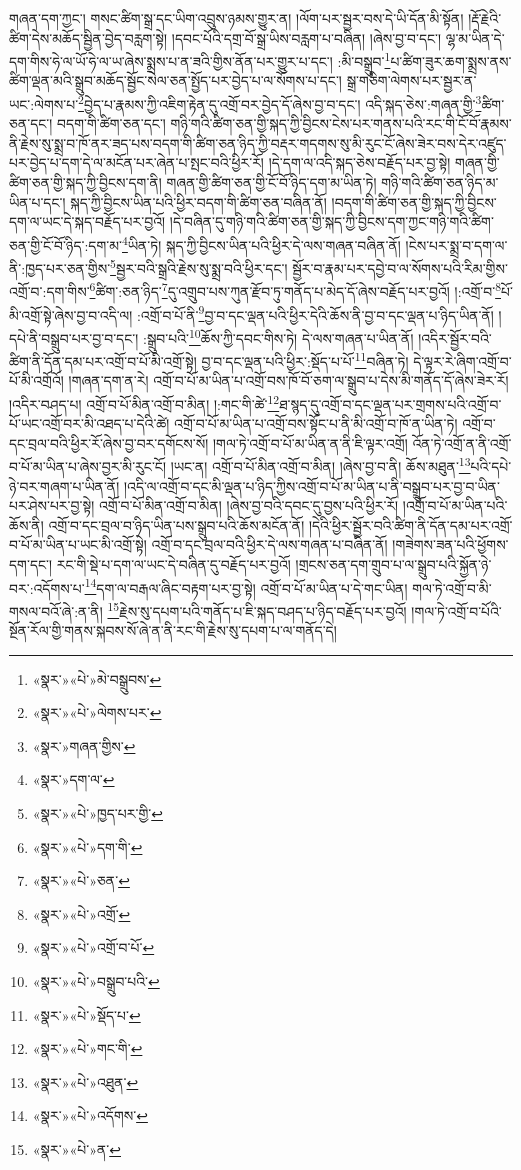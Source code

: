 གཞན་དག་ཀྱང་། གསང་ཚིག་སྒྲ་དང་ཡིག་འབྲུས་ཉམས་གྱུར་ན། །ལོག་པར་སྦྱར་བས་དེ་ཡི་དོན་མི་སྟོན། །རྡོ་རྗེའི་ཚིག་དེས་མཆོད་སྦྱིན་བྱེད་བརླག་སྟེ། །དབང་པོའི་དགྲ་བོ་སྒྲ་ཡིས་བརླག་པ་བཞིན། །ཞེས་བྱ་བ་དང་། ལྷ་མ་ཡིན་དེ་དག་གིས་ཧེ་ལ་ཡོ་ཧེ་ལ་ཡ་ཞེས་སྨྲས་པ་ན་ཟའི་གྱིས་ནོན་པར་གྱུར་པ་དང་། :མི་བསྒྲུབ་\footnote{«སྣར་»«པེ་»མེ་བསྒྲུབས་}པ་ཚིག་ཟུར་ཆག་སྨྲས་ནས་ཚིག་ལྡན་མའི་སྒྲུབ་མཆོད་སྦྱོང་སེལ་ཅན་སྤྱོད་པར་བྱེད་པ་ལ་སོགས་པ་དང་། སྒྲ་གཅིག་ལེགས་པར་སྦྱར་ན་ཡང་:ལེགས་པ་\footnote{«སྣར་»«པེ་»ལེགས་པར་}བྱེད་པ་རྣམས་ཀྱི་འཇིག་རྟེན་དུ་འགྲོ་བར་བྱེད་དོ་ཞེས་བྱ་བ་དང་། འདི་སྐད་ཅེས་:གཞན་གྱི་\footnote{«སྣར་»གཞན་གྱིས་}ཚིག་ཅན་དང་། བདག་གི་ཚིག་ཅན་དང་། གཉི་གའི་ཚིག་ཅན་གྱི་སྐད་ཀྱི་བྱིངས་ངེས་པར་གནས་པའི་རང་གི་ངོ་བོ་རྣམས་ནི་རྗེས་སུ་སྨྲ་བ་ཁོ་ནར་ཟད་པས་བདག་གི་ཚིག་ཅན་ཉིད་ཀྱི་བརྡར་གདགས་སུ་མི་རུང་ངོ་ཞེས་ཟེར་བས་དེར་འཛུད་པར་བྱེད་པ་དག་དེ་ལ་མངོན་པར་ཞེན་པ་སྤང་བའི་ཕྱིར་རོ། །དེ་དག་ལ་འདི་སྐད་ཅེས་བརྗོད་པར་བྱ་སྟེ། གཞན་གྱི་ཚིག་ཅན་གྱི་སྐད་ཀྱི་བྱིངས་དག་ནི། གཞན་གྱི་ཚིག་ཅན་གྱི་ངོ་བོ་ཉིད་དག་མ་ཡིན་ཏེ། གཉི་གའི་ཚིག་ཅན་ཉིད་མ་ཡིན་པ་དང་། སྐད་ཀྱི་བྱིངས་ཡིན་པའི་ཕྱིར་བདག་གི་ཚིག་ཅན་བཞིན་ནོ། །བདག་གི་ཚིག་ཅན་གྱི་སྐད་ཀྱི་བྱིངས་དག་ལ་ཡང་དེ་སྐད་བརྗོད་པར་བྱའོ། །དེ་བཞིན་དུ་གཉི་གའི་ཚིག་ཅན་གྱི་སྐད་ཀྱི་བྱིངས་དག་ཀྱང་གཉི་གའི་ཚིག་ཅན་གྱི་ངོ་བོ་ཉིད་:དག་མ་\footnote{«སྣར་»དག་ལ་}ཡིན་ཏེ། སྐད་ཀྱི་བྱིངས་ཡིན་པའི་ཕྱིར་དེ་ལས་གཞན་བཞིན་ནོ། །ངེས་པར་སྨྲ་བ་དག་ལ་ནི་:ཁྱད་པར་ཅན་གྱིས་\footnote{«སྣར་»«པེ་»ཁྱད་པར་གྱི་}སྦྱར་བའི་སྒྲའི་རྗེས་སུ་སྨྲ་བའི་ཕྱིར་དང་། སྦྱོར་བ་རྣམ་པར་དབྱེ་བ་ལ་སོགས་པའི་རིམ་གྱིས་འགྲོ་བ་:དག་གིས་\footnote{«སྣར་»«པེ་»དག་གི་}ཚིག་:ཅན་ཉིད་\footnote{«སྣར་»«པེ་»ཅན་}དུ་འགྲུབ་པས་ཀུན་རྫོབ་ཏུ་གནོད་པ་མེད་དོ་ཞེས་བརྗོད་པར་བྱའོ། །:འགྲོ་བ་\footnote{«སྣར་»«པེ་»འགྲོ་}པོ་མི་འགྲོ་སྟེ་ཞེས་བྱ་བ་འདི་ལ། :འགྲོ་བ་པོ་ནི་\footnote{«སྣར་»«པེ་»འགྲོ་བ་པོ་}བྱ་བ་དང་ལྡན་པའི་ཕྱིར་དེའི་ཆོས་ནི་བྱ་བ་དང་ལྡན་པ་ཉིད་ཡིན་ནོ། །དཔེ་ནི་བསྒྲུབ་པར་བྱ་བ་དང་། :སྒྲུབ་པའི་\footnote{«སྣར་»«པེ་»བསྒྲུབ་པའི་}ཆོས་ཀྱི་དབང་གིས་ཏེ། དེ་ལས་གཞན་པ་ཡིན་ནོ། །འདིར་སྦྱོར་བའི་ཚིག་ནི་དོན་དམ་པར་འགྲོ་བ་པོ་མི་འགྲོ་སྟེ། བྱ་བ་དང་ལྡན་པའི་ཕྱིར་:སྡོད་པ་པོ་\footnote{«སྣར་»«པེ་»སྡོད་པ་}བཞིན་ཏེ། དེ་ལྟར་རེ་ཞིག་འགྲོ་བ་པོ་མི་འགྲོའོ། །གཞན་དག་ན་རེ། འགྲོ་བ་པོ་མ་ཡིན་པ་འགྲོ་བས་ཁོ་བོ་ཅག་ལ་སྒྲུབ་པ་དེས་མི་གནོད་དོ་ཞེས་ཟེར་རོ། །འདིར་བཤད་པ། འགྲོ་བ་པོ་མིན་འགྲོ་བ་མིན། །:གང་གི་ཚེ་\footnote{«སྣར་»«པེ་»གང་གི་}ཐ་སྙད་དུ་འགྲོ་བ་དང་ལྡན་པར་གྲགས་པའི་འགྲོ་བ་པོ་ཡང་འགྲོ་བར་མི་འཐད་པ་དེའི་ཚེ། འགྲོ་བ་པོ་མ་ཡིན་པ་འགྲོ་བས་སྟོང་པ་ནི་མི་འགྲོ་བ་ཁོ་ན་ཡིན་ཏེ། འགྲོ་བ་དང་བྲལ་བའི་ཕྱིར་རོ་ཞེས་བྱ་བར་དགོངས་སོ། །གལ་ཏེ་འགྲོ་བ་པོ་མ་ཡིན་ན་ནི་ཇི་ལྟར་འགྲོ། འོན་ཏེ་འགྲོ་ན་ནི་འགྲོ་བ་པོ་མ་ཡིན་པ་ཞེས་བྱར་མི་རུང་ངོ། །ཡང་ན། འགྲོ་བ་པོ་མིན་འགྲོ་བ་མིན། །ཞེས་བྱ་བ་ནི། ཆོས་མཐུན་\footnote{«སྣར་»«པེ་»འཐུན་}པའི་དཔེ་ཉེ་བར་གཞག་པ་ཡིན་ནོ། །འདི་ལ་འགྲོ་བ་དང་མི་ལྡན་པ་ཉིད་ཀྱིས་འགྲོ་བ་པོ་མ་ཡིན་པ་ནི་བསྒྲུབ་པར་བྱ་བ་ཡིན་པར་ཤེས་པར་བྱ་སྟེ། འགྲོ་བ་པོ་མིན་འགྲོ་བ་མིན། །ཞེས་བྱ་བའི་དབང་དུ་བྱས་པའི་ཕྱིར་རོ། །འགྲོ་བ་པོ་མ་ཡིན་པའི་ཆོས་ནི། འགྲོ་བ་དང་བྲལ་བ་ཉིད་ཡིན་པས་སྒྲུབ་པའི་ཆོས་མངོན་ནོ། །དེའི་ཕྱིར་སྦྱོར་བའི་ཚིག་ནི་དོན་དམ་པར་འགྲོ་བ་པོ་མ་ཡིན་པ་ཡང་མི་འགྲོ་སྟེ། འགྲོ་བ་དང་བྲལ་བའི་ཕྱིར་དེ་ལས་གཞན་པ་བཞིན་ནོ། །གཟེགས་ཟན་པའི་ཕྱོགས་དག་དང་། རང་གི་སྡེ་པ་དག་ལ་ཡང་དེ་བཞིན་དུ་བརྗོད་པར་བྱའོ། །གྲངས་ཅན་དག་གྲུབ་པ་ལ་སྒྲུབ་པའི་སྐྱོན་ཉེ་བར་:འདོགས་པ་\footnote{«སྣར་»«པེ་»འདོགས་}དག་ལ་བརྒལ་ཞིང་བརྟག་པར་བྱ་སྟེ། འགྲོ་བ་པོ་མ་ཡིན་པ་དེ་གང་ཡིན། གལ་ཏེ་འགྲོ་བ་མི་གསལ་བའོ་ཞེ་:ན་ནི། \footnote{«སྣར་»«པེ་»ན་}རྗེས་སུ་དཔག་པའི་གནོད་པ་ཇི་སྐད་བཤད་པ་ཉིད་བརྗོད་པར་བྱའོ། །གལ་ཏེ་འགྲོ་བ་པོའི་སྔོན་རོལ་གྱི་གནས་སྐབས་སོ་ཞེ་ན་ནི་རང་གི་རྗེས་སུ་དཔག་པ་ལ་གནོད་དེ། 